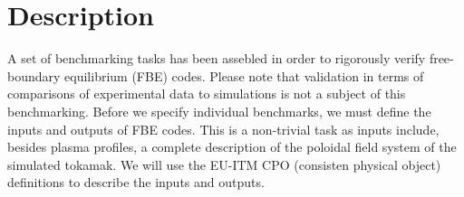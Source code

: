 
\section{Description} %
\label{sec:description}

A set of benchmarking tasks has been assebled in order to rigorously verify free-boundary equilibrium (FBE) codes. Please note that validation in terms of comparisons of experimental data to simulations is not a subject of this benchmarking. Before we specify individual benchmarks, we must define the inputs and outputs of FBE codes. This is a non-trivial task as inputs include, besides plasma profiles, a complete description of the poloidal field system of the simulated tokamak. We will use the EU-ITM CPO (consisten physical object) definitions to describe the inputs and outputs.

